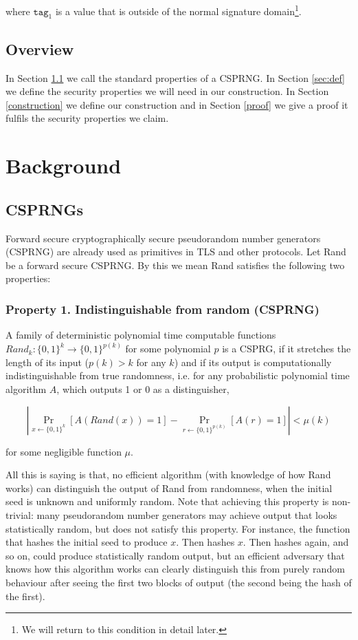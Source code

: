 \documentclass[12pt]{article}
\begin{document}
where $\texttt{tag}_1$ is a value that is outside of the
normal signature domain\footnote{We will return to this condition in
	detail later.}. 

\subsection*{Overview}
In Section \ref{CSPRNG} we call the standard properties of a CSPRNG. In Section \ref{sec:def} we define the security properties we will need in our construction. In Section \ref{construction} we define our construction and in Section \ref{proof} we give a proof it fulfils the security properties we claim. 


\section{Background}

\subsection{CSPRNGs} \label{CSPRNG}
Forward secure cryptographically secure pseudorandom number generators (CSPRNG) are already used as primitives in TLS and other protocols. Let Rand be a forward secure CSPRNG. By this we mean Rand satisfies the following two properties:

\subsubsection*{Property 1. Indistinguishable from random (CSPRNG)}

A family of deterministic polynomial time computable functions $Rand_{k} \colon \{0, 1\}^{k} \rightarrow \{0, 1 \}^{p(k)}$ for some polynomial $p$ is a  CSPRG, if it stretches the length of its input ($p(k) > k$ for any $k$) and if its output is computationally indistinguishable from true randomness, i.e. for any probabilistic polynomial time algorithm $A$, which outputs 1 or 0 as a distinguisher,

$$ |\Pr_{x\gets\{0,1\}^k}[A(Rand(x))=1] - \Pr_{r\gets\{0,1\}^{p(k)}}[A(r)=1]| < \mu(k) $$

\noindent for some negligible function $\mu$.

All this is saying is that, no efficient algorithm (with knowledge of how Rand works) can distinguish the output of Rand from randomness, when the initial seed is unknown and uniformly random. Note that achieving this property is non-trivial: many pseudorandom number generators may achieve output that looks statistically random, but does not satisfy this property. For instance, the function that hashes the initial seed to produce $x$. Then hashes $x$. Then hashes again, and so on, could produce statistically random output, but an efficient adversary that knows how this algorithm works can clearly distinguish this from purely random behaviour after seeing the first two blocks of output (the second being the hash of the first).
\end{document}
